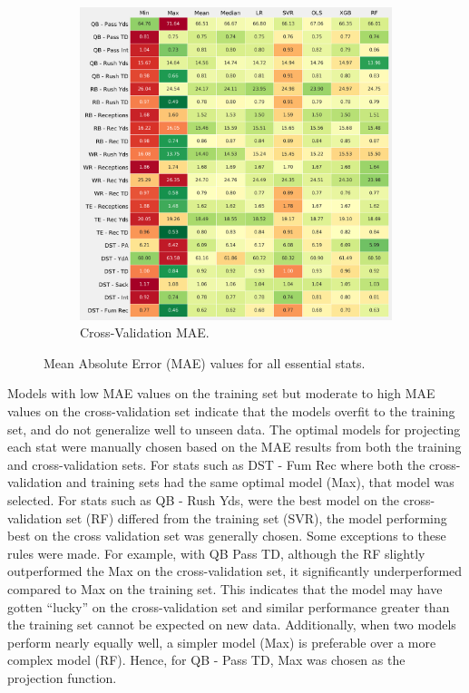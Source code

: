 \documentclass[12pt]{article}
\begin{document}
\begin{figure}[H]
\begin{subfigure}[b]{0.490\textwidth}
    \includegraphics[width=1\textwidth]{../figures/essential_cv_MAE_table}
    \caption{Cross-Validation MAE.}
  \end{subfigure}
  \caption{Mean Absolute Error (MAE) values for all essential stats.}
  \label{train/cv MAE}
\end{figure}

Models with low MAE values on the training set but moderate to high MAE values on the cross-validation set indicate that the models overfit to the training set, and do not generalize well to unseen data. The optimal models for projecting each stat were manually chosen based on the MAE results from both the training and cross-validation sets. For stats such as DST - Fum Rec where both the cross-validation and training sets had the same optimal model (Max), that model was selected. For stats such as QB - Rush Yds, were the best model on the cross-validation set (RF) differed from the training set (SVR), the model performing best on the cross validation set was generally chosen. Some exceptions to these rules were made. For example, with QB Pass TD, although the RF slightly outperformed the Max on the cross-validation set, it significantly underperformed compared to Max on the training set. This indicates that the model may have gotten ``lucky'' on the cross-validation set and similar performance greater than the training set cannot be expected on new data. Additionally, when two models perform nearly equally well, a simpler model (Max) is preferable over a more complex model (RF). Hence, for QB - Pass TD, Max was chosen as the projection function.\bigskip
\end{document}
